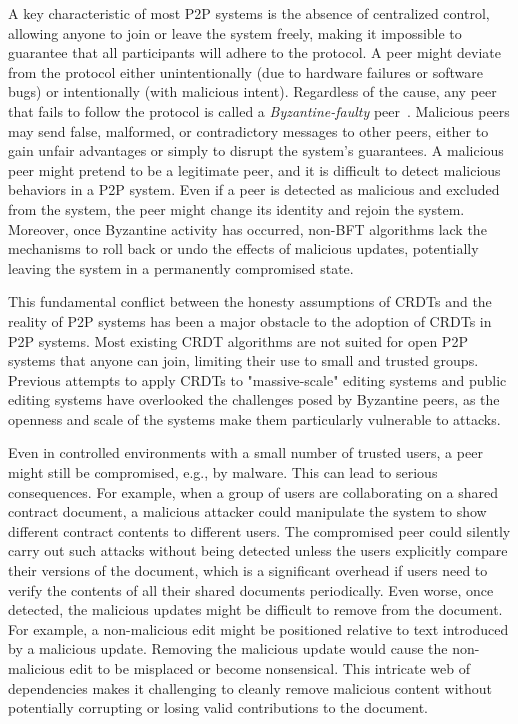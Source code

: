 \documentclass[11pt]{article}
\begin{document}

A key characteristic of most P2P systems is the absence of centralized control, allowing anyone to join or leave the system freely, making it impossible to guarantee that all participants will adhere to the protocol. A peer might deviate from the protocol either unintentionally (due to hardware failures or software bugs) or intentionally (with malicious intent). Regardless of the cause, any peer that fails to follow the protocol is called a \emph{Byzantine-faulty} peer~\cite{lamport2019byzantine}. Malicious peers may send false, malformed, or contradictory messages to other peers, either to gain unfair advantages or simply to disrupt the system's guarantees. A malicious peer might pretend to be a legitimate peer, and it is difficult to detect malicious behaviors in a P2P system. Even if a peer is detected as malicious and excluded from the system, the peer might change its identity and rejoin the system. Moreover, once Byzantine activity has occurred, non-BFT algorithms lack the mechanisms to roll back or undo the effects of malicious updates, potentially leaving the system in a permanently compromised state.

This fundamental conflict between the honesty assumptions of CRDTs and the reality of P2P systems has been a major obstacle to the adoption of CRDTs in P2P systems. Most existing CRDT algorithms are not suited for open P2P systems that anyone can join, limiting their use to small and trusted groups. Previous attempts to apply CRDTs to "massive-scale" editing systems \cite{andre2013supporting, lv2016efficient, weiss2009logoot} and public editing systems \cite{weiss2009logoot, nedelec2016crate, weiss2007wooki} have overlooked the challenges posed by Byzantine peers, as the openness and scale of the systems make them particularly vulnerable to attacks.

Even in controlled environments with a small number of trusted users, a peer might still be compromised, e.g., by malware. This can lead to serious consequences. For example, when a group of users are collaborating on a shared contract document, a malicious attacker could manipulate the system to show different contract contents to different users. The compromised peer could silently carry out such attacks without being detected unless the users explicitly compare their versions of the document, which is a significant overhead if users need to verify the contents of all their shared documents periodically. Even worse, once detected, the malicious updates might be difficult to remove from the document. For example, a non-malicious edit might be positioned relative to text introduced by a malicious update. Removing the malicious update would cause the non-malicious edit to be misplaced or become nonsensical. This intricate web of dependencies makes it challenging to cleanly remove malicious content without potentially corrupting or losing valid contributions to the document.
\end{document}
